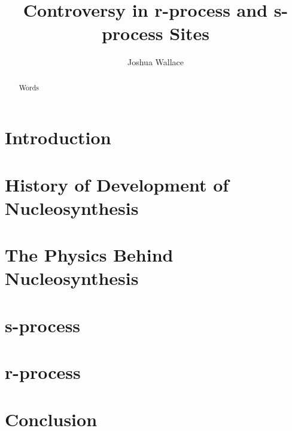 \documentclass{emulateapj}
\begin{document}
\title{Controversy in r-process and s-process Sites}

\author{Joshua Wallace}

\begin{abstract}
Words
\end{abstract}


\section{Introduction}


\section{History of Development of Nucleosynthesis}

\section{The Physics Behind Nucleosynthesis}

\section{s-process}



\section{r-process}



\section{Conclusion}



\end{document}
